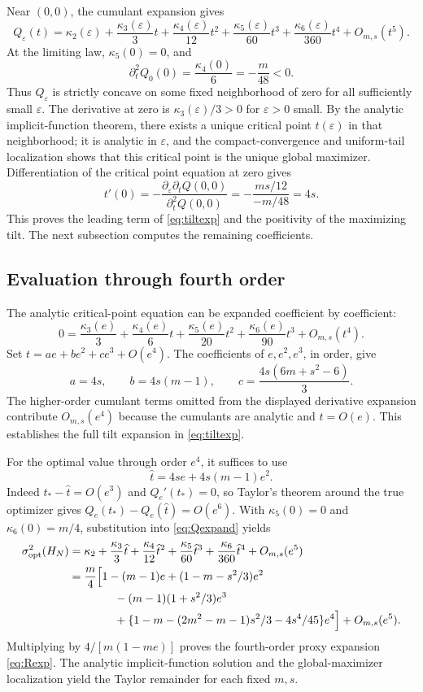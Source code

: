 \documentclass[11pt,a4paper]{article}
\begin{document}
Near $(0,0)$, the cumulant expansion gives
\begin{equation}\label{eq:Qexpand}
 Q_\varepsilon(t)=\kappa_2(\varepsilon)
 +\frac{\kappa_3(\varepsilon)}3t
 +\frac{\kappa_4(\varepsilon)}{12}t^2
 +\frac{\kappa_5(\varepsilon)}{60}t^3
 +\frac{\kappa_6(\varepsilon)}{360}t^4+O_{m,s}(t^5).
\end{equation}
At the limiting law, $\kappa_5(0)=0$, and
\[
 \partial_t^2Q_0(0)=\frac{\kappa_4(0)}6=-\frac m{48}<0.
\]
Thus $Q_\varepsilon$ is strictly concave on some fixed neighborhood of zero for all sufficiently small $\varepsilon$. The derivative at zero is $\kappa_3(\varepsilon)/3>0$ for $\varepsilon>0$ small. By the analytic implicit-function theorem, there exists a unique critical point $t(\varepsilon)$ in that neighborhood; it is analytic in $\varepsilon$, and the compact-convergence and uniform-tail localization shows that this critical point is the unique global maximizer. Differentiation of the critical point equation at zero gives
\[
 t'(0)=-\frac{\partial_\varepsilon\partial_t Q(0,0)}{\partial_t^2Q(0,0)}
 =-\frac{ms/12}{-m/48}=4s.
\]
This proves the leading term of \eqref{eq:tiltexp} and the positivity of the maximizing tilt. The next subsection computes the remaining coefficients.

\subsection{Evaluation through fourth order}
The analytic critical-point equation can be expanded coefficient by coefficient:
\[
 0=\frac{\kappa_3(e)}3+\frac{\kappa_4(e)}6t
 +\frac{\kappa_5(e)}{20}t^2+\frac{\kappa_6(e)}{90}t^3+O_{m,s}(t^4).
\]
Set $t=a e+b e^2+c e^3+O(e^4)$. The coefficients of $e,e^2,e^3$, in order, give
\[
 a=4s,\qquad b=4s(m-1),\qquad c=\frac{4s(6m+s^2-6)}3.
\]
The higher-order cumulant terms omitted from the displayed derivative expansion contribute $O_{m,s}(e^4)$ because the cumulants are analytic and $t=O(e)$. This establishes the full tilt expansion in \eqref{eq:tiltexp}.

For the optimal value through order $e^4$, it suffices to use
\[
 \widehat t=4se+4s(m-1)e^2.
\]
Indeed $t_* -\widehat t=O(e^3)$ and $Q_e'(t_*)=0$, so Taylor's theorem around the true optimizer gives $Q_e(t_*)-Q_e(\widehat t)=O(e^6)$. With $\kappa_5(0)=0$ and $\kappa_6(0)=m/4$, substitution into \eqref{eq:Qexpand} yields
\begin{align*}
 \sigma^2_{\mathrm{opt}}(H_N)
 &=\kappa_2+\frac{\kappa_3}3\widehat t
 +\frac{\kappa_4}{12}\widehat t^2
 +\frac{\kappa_5}{60}\widehat t^3
 +\frac{\kappa_6}{360}\widehat t^4+O_{m,s}(e^5)\\
 &=\frac m4\Bigl[1-(m-1)e+(1-m-s^2/3)e^2\\
 &\hspace{14mm}-(m-1)(1+s^2/3)e^3\\
 &\hspace{14mm}+\{1-m-(2m^2-m-1)s^2/3-4s^4/45\}e^4\Bigr]
 +O_{m,s}(e^5).
\end{align*}
Multiplying by $4/[m(1-me)]$ proves the fourth-order proxy expansion \eqref{eq:Rexp}. The analytic implicit-function solution and the global-maximizer localization yield the Taylor remainder for each fixed $m,s$.
\end{document}
